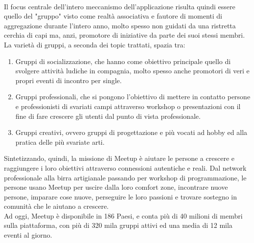 \documentclass[fleqn,10pt]{SelfArx} %
\begin{document}
{\\
Il focus centrale dell'intero meccanismo dell'applicazione risulta quindi essere quello del "gruppo" visto come realtà associativa e fautore di momenti di aggregazione durante l'intero anno, molto spesso non guidati da una ristretta cerchia di capi ma, anzi, promotore di iniziative da parte dei suoi stessi membri. La varietà di gruppi, a seconda dei topic trattati, spazia tra:
\begin{enumerate}
\item Gruppi di socializzazione, che hanno come obiettivo principale quello di svolgere attività ludiche in compagnia, molto spesso anche promotori di veri e propri eventi di incontro per single.
\item Gruppi professionali, che si pongono l'obiettivo di mettere in contatto persone e professionisti di svariati campi attraverso workshop o presentazioni con il fine di fare crescere gli utenti dal punto di vista professionale.
\item Gruppi creativi, ovvero gruppi di progettazione e più vocati ad hobby ed alla pratica delle più svariate arti. \\
\end{enumerate}
Sintetizzando, quindi, la missione di Meetup è aiutare le persone a crescere e raggiungere i loro obiettivi attraverso connessioni autentiche e reali. Dal network professionale alla birra artigianale passando per workshop di programmazione, le persone usano Meetup per uscire dalla loro comfort zone, incontrare nuove persone, imparare cose nuove, perseguire le loro passioni e trovare sostegno in comunità che le aiutano a crescere.\\
Ad oggi, Meetup è disponibile in 186 Paesi, e conta più di 40 milioni di membri sulla piattaforma, con più di 320 mila gruppi attivi ed una media di 12 mila eventi al giorno.
}
\end{document}
